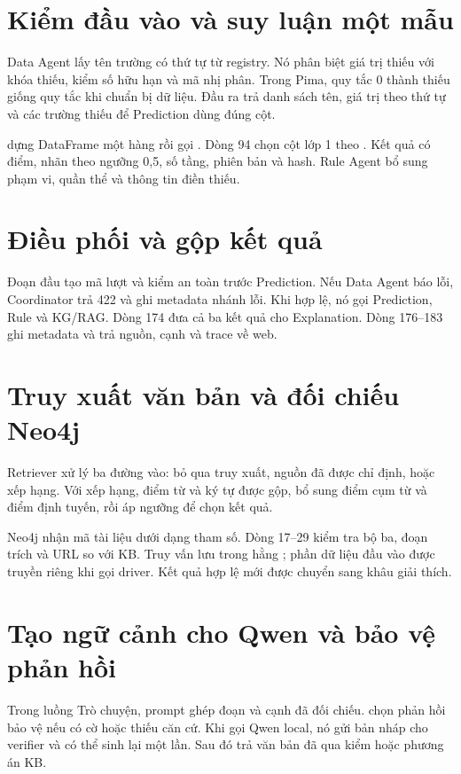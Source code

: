 \section{Kiểm đầu vào và suy luận một mẫu}
Data Agent lấy tên trường có thứ tự từ registry. Nó phân biệt giá trị thiếu với khóa thiếu, kiểm số hữu hạn và mã nhị phân. Trong Pima, quy tắc 0 thành thiếu giống quy tắc khi chuẩn bị dữ liệu. Đầu ra trả danh sách tên, giá trị theo thứ tự và các trường thiếu để Prediction dùng đúng cột.

 dựng DataFrame một hàng rồi gọi . Dòng 94 chọn cột lớp 1 theo . Kết quả có điểm, nhãn theo ngưỡng 0,5, số tầng, phiên bản và hash. Rule Agent bổ sung phạm vi, quần thể và thông tin điền thiếu.

\section{Điều phối và gộp kết quả}
Đoạn đầu tạo mã lượt và kiểm an toàn trước Prediction. Nếu Data Agent báo lỗi, Coordinator trả 422 và ghi metadata nhánh lỗi. Khi hợp lệ, nó gọi Prediction, Rule và KG/RAG. Dòng 174 đưa cả ba kết quả cho Explanation. Dòng 176--183 ghi metadata và trả nguồn, cạnh và trace về web.

\section{Truy xuất văn bản và đối chiếu Neo4j}
Retriever xử lý ba đường vào: bỏ qua truy xuất, nguồn đã được chỉ định, hoặc xếp hạng. Với xếp hạng, điểm từ và ký tự được gộp, bổ sung điểm cụm từ và điểm định tuyến, rồi áp ngưỡng để chọn kết quả.

Neo4j nhận mã tài liệu dưới dạng tham số. Dòng 17--29 kiểm tra bộ ba, đoạn trích và URL so với KB. Truy vấn lưu trong hằng ; phần dữ liệu đầu vào được truyền riêng khi gọi driver. Kết quả hợp lệ mới được chuyển sang khâu giải thích.

\section{Tạo ngữ cảnh cho Qwen và bảo vệ phản hồi}
Trong luồng Trò chuyện, prompt ghép đoạn và cạnh đã đối chiếu.  chọn phản hồi bảo vệ nếu có cờ hoặc thiếu căn cứ. Khi gọi Qwen local, nó gửi bản nháp cho verifier và có thể sinh lại một lần. Sau đó trả văn bản đã qua kiểm hoặc phương án KB.

